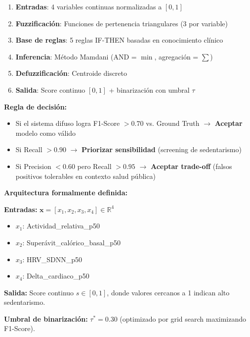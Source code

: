 \documentclass[12pt,letterpaper,twoside]{report}
\newcommand{\vect}[1]{\boldsymbol{#1}}
\begin{document}
\begin{calculobox}
\begin{estadisticobox}
\begin{enumerate}[noitemsep]
    \item \textbf{Entradas}: 4 variables continuas normalizadas a $[0,1]$
    \item \textbf{Fuzzificación}: Funciones de pertenencia triangulares (3 por variable)
    \item \textbf{Base de reglas}: 5 reglas IF-THEN basadas en conocimiento clínico
    \item \textbf{Inferencia}: Método Mamdani (AND = $\min$, agregación = $\sum$)
    \item \textbf{Defuzzificación}: Centroide discreto
    \item \textbf{Salida}: Score continuo $[0,1]$ + binarización con umbral $\tau$
\end{enumerate}
\end{estadisticobox}

\begin{reglabox}
\textbf{Regla de decisión:}

\begin{itemize}[noitemsep]
    \item Si el sistema difuso logra F1-Score $> 0.70$ vs. Ground Truth $\to$ \textbf{Aceptar} modelo como válido
    \item Si Recall $> 0.90$ $\to$ \textbf{Priorizar sensibilidad} (screening de sedentarismo)
    \item Si Precision $< 0.60$ pero Recall $> 0.95$ $\to$ \textbf{Aceptar trade-off} (falsos positivos tolerables en contexto salud pública)
\end{itemize}
\end{reglabox}

\begin{calculobox}
\textbf{Arquitectura formalmente definida:}

\textbf{Entradas:} $\vect{x} = [x_1, x_2, x_3, x_4] \in \mathbb{R}^4$
\begin{itemize}[noitemsep]
    \item $x_1$: Actividad\_relativa\_p50
    \item $x_2$: Superávit\_calórico\_basal\_p50
    \item $x_3$: HRV\_SDNN\_p50
    \item $x_4$: Delta\_cardiaco\_p50
\end{itemize}

\textbf{Salida:} Score continuo $s \in [0,1]$, donde valores cercanos a 1 indican alto sedentarismo.

\textbf{Umbral de binarización:} $\tau^* = 0.30$ (optimizado por grid search maximizando F1-Score).
\end{calculobox}


\end{calculobox}
\end{document}
